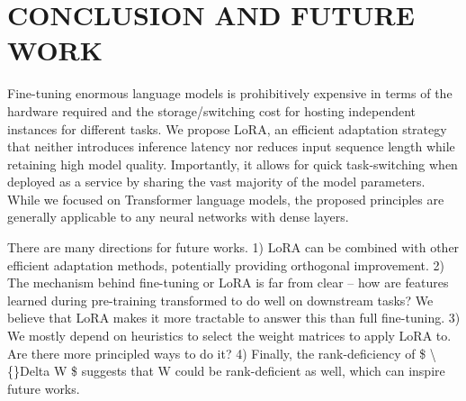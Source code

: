 \documentclass[conference]{IEEEtran}
\begin{document}
\section{CONCLUSION AND FUTURE WORK}

Fine-tuning enormous language models is prohibitively expensive in terms of the hardware required and the storage/switching cost for hosting independent instances for different tasks. We propose LoRA, an efficient adaptation strategy that neither introduces inference latency nor reduces input sequence length while retaining high model quality. Importantly, it allows for quick task-switching when deployed as a service by sharing the vast majority of the model parameters. While we focused on Transformer language models, the proposed principles are generally applicable to any neural networks with dense layers.

There are many directions for future works. 1) LoRA can be combined with other efficient adaptation methods, potentially providing orthogonal improvement. 2) The mechanism behind fine-tuning or LoRA is far from clear – how are features learned during pre-training transformed to do well on downstream tasks? We believe that LoRA makes it more tractable to answer this than full fine-tuning. 3) We mostly depend on heuristics to select the weight matrices to apply LoRA to. Are there more principled ways to do it? 4) Finally, the rank-deficiency of  \$ \textbackslash\{\}Delta W \$ suggests that W could be rank-deficient as well, which can inspire future works.
\end{document}
